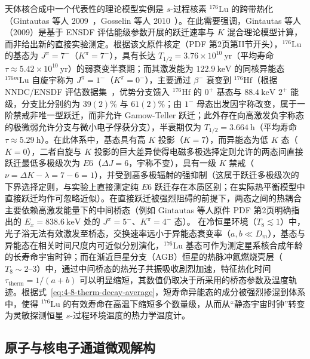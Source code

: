 天体核合成中一个代表性的理论模型实例是 $s$-过程核素 $^{176}\mathrm{Lu}$ 的跨带热化（Gintautas 等人 2009~\cite{gintautas-2009-176lu-thermal-equilibration}，Gosselin 等人 2010~\cite{gosselin-2010-plasma-isomers-176lu-180ta}）。在此需要强调，Gintautas 等人（2009）是基于 ENSDF 评估能级参数开展的跃迁速率与 $K$ 混合理论模型计算，而非给出新的直接实验测定。根据该文原件核定（PDF 第2页第II节开头），$^{176}\mathrm{Lu}$ 的基态为 $J^\pi = 7^-$（$K^\pi = 7^-$），具有长达 $T_{1/2} = 3.76 \times 10^{10}\ \mathrm{yr}$（平均寿命 $\tau \approx 5.42 \times 10^{10}\ \mathrm{yr}$）的弱衰变半衰期；而其激发能为 $122.9\ \mathrm{keV}$ 的同核异能态 $^{176m}\mathrm{Lu}$ 自旋宇称为 $J^\pi = 1^-$（$K^\pi = 0^-$），主要通过 $\beta^-$ 衰变到 $^{176}\mathrm{Hf}$（根据 NNDC/ENSDF 评估数据集~\cite{nndc-176lu-beta-2006-snapshot}，优势分支馈入 $^{176}\mathrm{Hf}$ 的 $0^+$ 基态与 $88.4\ \mathrm{keV}$ $2^+$ 能级，分支比分别约为 $39(2)\%$ 与 $61(2)\%$；由 $1^-$ 母态出发因宇称改变，属于一阶禁戒非唯一型跃迁，而非允许 Gamow-Teller 跃迁；此外存在向高激发负宇称态的极微弱允许分支与微小电子俘获分支），半衰期仅为 $T_{1/2} = 3.664\ \mathrm{h}$（平均寿命 $\tau \approx 5.29\ \mathrm{h}$）。在此体系中，基态具有高 $K$ 投影（$K=7$），而异能态为低 $K$ 态（$K=0$），二者自旋与 $K$ 投影的巨大差异使得电磁多极选择定则允许的两态间直接跃迁最低多极级次为 $E6$（$\Delta J = 6$，宇称不变），具有一级 $K$ 禁戒（$\nu = \Delta K-\lambda = 7-6=1$），并受到高多极辐射的强抑制（这属于跃迁多极级次的下界选择定则，与实验上直接测定纯 $E6$ 跃迁存在本质区别；在实际热平衡模型中直接跃迁均作可忽略近似）。在直接跃迁被强烈阻碍的前提下，两态之间的热耦合主要依赖高激发能量下的中间桥态（例如 Gintautas 等人原件 PDF 第2页明确指出的 $E_x = 838.6\ \mathrm{keV}$ 处的 $J^\pi = 5^-$、$K^\pi = 4^-$ 态）。
在冷恒星环境（$T_8 \lesssim 1$）中，光子浴无法有效激发至桥态，交换速率远小于异能态衰变率（$a, b \ll D_m$），基态与异能态在相关时间尺度内可近似分别演化，$^{176}\mathrm{Lu}$ 基态可作为测定星系核合成年龄的长寿命宇宙时钟；而在渐近巨星分支（AGB）恒星的热脉冲氦燃烧壳层（$T_8 \sim 2$--$3$）中，通过中间桥态的热光子共振吸收剧烈加速，特征热化时间 $\tau_{\mathrm{therm}} = 1/(a+b)$ 可以明显缩短，其数值仍取决于所采用的桥态参数及温度轨迹。根据式~\eqref{eq:4-8-therm-decay-average}，短寿命异能态的成分被强烈掺混到体系中，使得 $^{176}\mathrm{Lu}$ 的有效寿命在高温下缩短多个数量级，从而从“静态宇宙时钟”转变为灵敏探测恒星 $s$-过程环境温度的热力学温度计。

\subsection{原子与核电子通道微观解构}\label{sec:4-8-2}

